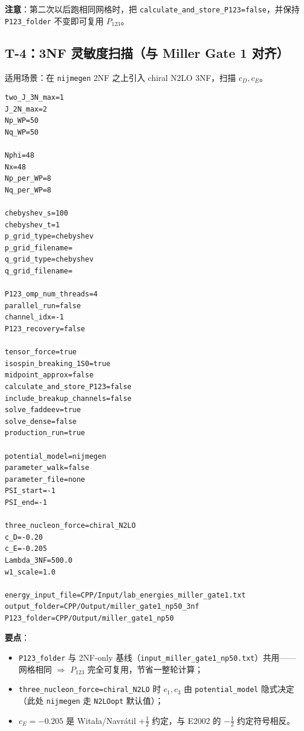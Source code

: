 \textbf{注意}：第二次以后跑相同网格时，把 \texttt{calculate\_and\_store\_P123=false}，并保持 \texttt{P123\_folder} 不变即可复用 \(P_{123}\)。

\subsection{T-4：3NF 灵敏度扫描（与 Miller Gate 1 对齐）}
\label{subsec:appE_T4}

适用场景：在 \texttt{nijmegen} 2NF 之上引入 chiral N2LO 3NF，扫描 \(c_D,c_E\)。

\begin{lstlisting}[style=config,caption={\texttt{input\_miller\_gate1\_np50\_3nf.txt}（仓库实际模板）},label={lst:appE_miller_gate1_3nf}]
two_J_3N_max=1
J_2N_max=2
Np_WP=50
Nq_WP=50

Nphi=48
Nx=48
Np_per_WP=8
Nq_per_WP=8

chebyshev_s=100
chebyshev_t=1
p_grid_type=chebyshev
p_grid_filename=
q_grid_type=chebyshev
q_grid_filename=

P123_omp_num_threads=4
parallel_run=false
channel_idx=-1
P123_recovery=false

tensor_force=true
isospin_breaking_1S0=true
midpoint_approx=false
calculate_and_store_P123=false
include_breakup_channels=false
solve_faddeev=true
solve_dense=false
production_run=true

potential_model=nijmegen
parameter_walk=false
parameter_file=none
PSI_start=-1
PSI_end=-1

three_nucleon_force=chiral_N2LO
c_D=-0.20
c_E=-0.205
Lambda_3NF=500.0
w1_scale=1.0

energy_input_file=CPP/Input/lab_energies_miller_gate1.txt
output_folder=CPP/Output/miller_gate1_np50_3nf
P123_folder=CPP/Output/miller_gate1_np50
\end{lstlisting}

\textbf{要点}：
\begin{itemize}
  \item \texttt{P123\_folder} 与 2NF-only 基线（\texttt{input\_miller\_gate1\_np50.txt}）共用——网格相同 \(\Rightarrow\) \(P_{123}\) 完全可复用，节省一整轮计算；
  \item \texttt{three\_nucleon\_force=chiral\_N2LO} 时 \(c_1,c_3\) 由 \texttt{potential\_model} 隐式决定（此处 \texttt{nijmegen} 走 \texttt{N2LOopt} 默认值）；
  \item \(c_E=-0.205\) 是 Witała/Navrátil \(+\tfrac12\) 约定，与 E2002 的 \(-\tfrac12\) 约定符号相反。
\end{itemize}

